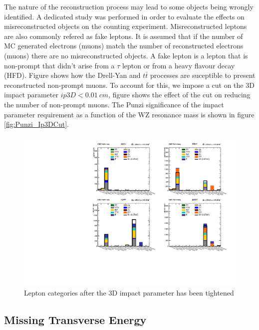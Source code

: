 The nature of the reconstruction process may lead to some objects being
wrongly identified. A dedicated study was performed in order to evaluate
the effects on misreconstructed objects on the counting experiment.
Misreconstructed leptons are also commonly refered as fake leptons. It
is assumed that if the number of MC generated electrons (muons) match
the number of reconstructed electrons (muons) there are no misreconstructed
objects. A fake lepton is a lepton that is non-prompt that didn't arise from
a $\tau$ lepton or from a heavy flavour decay (HFD). Figure %
shows how the Drell-Yan and $t\bar{t}$ processes are suceptible to present
reconstructed non-prompt muons. To account for this, we impose a cut on the
3D impact parameter $ip3D<0.01~cm$, figure %
shows the effect of the cut on reducing the number of non-prompt muons.
The Punzi significance of the impact parameter requirement as a function
of the WZ resonance mass is shown in figure \ref{fig:Punzi_Ip3DCut}. %



\begin{figure}[tph]
  \centering
  \includegraphics[width=\textwidth]{fig/Run2/Rebining_HFakeString_SR1_A_RuRun2_M600.pdf}
  \caption{Lepton categories after the 3D impact parameter has been tightened}
  \label{fig:HFakeString_AfterIp3DCut}
\end{figure}






\subsection{Missing Transverse Energy}

